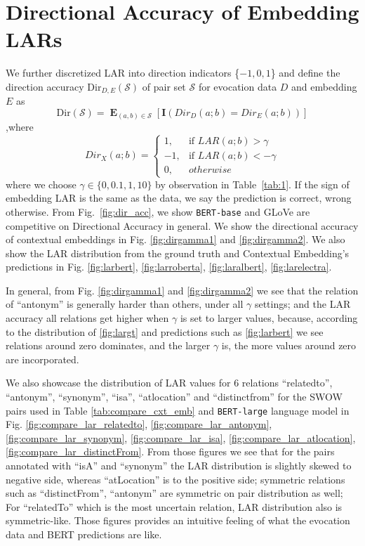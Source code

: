 \documentclass[letterpaper]{article} %
\begin{document}
\section{Directional Accuracy of Embedding LARs}
\label{app:dir_acc}
We further discretized LAR into direction indicators \{$-1,0,1$\} and define the direction accuracy $\mbox{Dir}_{D,E}(\mathcal{S})$ of pair set $\mathcal{S}$ for evocation data $D$ and embedding $E$ as 
\begin{equation}
    \mbox{Dir}(\mathcal{S})=\mathop{\mathbf{E}}_{(a,b) \in \mathcal{S}} [\mathbf{I}(Dir_D(a;b)=Dir_E(a;b))]
\end{equation}
,where
\begin{equation}
\label{eq:diracc}
    Dir_X(a;b)= 
\begin{cases}
    1, &\mbox{if } LAR(a;b)> \gamma\\
    -1, &\mbox{if } LAR(a;b)< -\gamma\\
    0,   &            otherwise
\end{cases}
\end{equation}
where we choose $\gamma \in \{0,0.1,1,10\}$ by observation in Table~\ref{tab:1}. If the sign of embedding LAR is the same as the data, we say the prediction is correct, wrong otherwise. From Fig.~\ref{fig:dir_acc}, we show \texttt{BERT-base} and GLoVe are competitive on Directional Accuracy in general. We show the directional accuracy of contextual embeddings in Fig. \ref{fig:dirgamma1} and \ref{fig:dirgamma2}. We also show the LAR distribution from the ground truth and Contextual Embedding's predictions in Fig. \ref{fig:larbert}, \ref{fig:larroberta}, \ref{fig:laralbert}, \ref{fig:larelectra}. 

In general, from Fig. \ref{fig:dirgamma1} and \ref{fig:dirgamma2} we see that the relation of ``antonym'' is generally harder than others, under all $\gamma$ settings; and the LAR accuracy all relations get higher when $\gamma$ is set to larger values, because, according to the distribution of \ref{fig:largt} and predictions such as \ref{fig:larbert} we see relations around zero dominates, and the larger $\gamma$ is, the more values around zero are incorporated.

We also showcase the distribution of LAR values for 6 relations ``relatedto'', ``antonym'', ``synonym'', ``isa'', ``atlocation'' and ``distinctfrom'' for the SWOW pairs used in Table \ref{tab:compare_cxt_emb} and \texttt{BERT-large} language model in Fig. \ref{fig:compare_lar_relatedto}, \ref{fig:compare_lar_antonym}, \ref{fig:compare_lar_synonym}, \ref{fig:compare_lar_isa}, \ref{fig:compare_lar_atlocation}, \ref{fig:compare_lar_distinctFrom}. From those figures we see that for the pairs annotated with ``isA'' and ``synonym'' the LAR distribution is slightly skewed to negative side, whereas ``atLocation'' is to the positive side; symmetric relations such as ``distinctFrom'', ``antonym'' are symmetric on pair distribution as well; For ``relatedTo'' which is the most uncertain relation, LAR distribution also is symmetric-like. Those figures provides an intuitive feeling of what the evocation data and BERT predictions are like.
\end{document}
